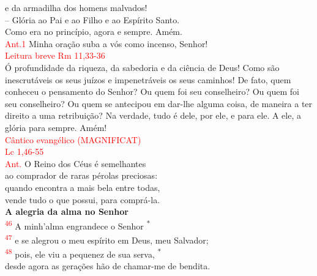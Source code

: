\documentclass{book}
\begin{document}
\begin{center}
    e da armadilha dos homens malvados!
    \vspace{.2cm} \\
    -- Glória ao Pai e ao Filho e ao Espírito Santo. \\
    Como era no princípio, agora e sempre. Amém.
    \vspace{.2cm} \\
    \textcolor{red}{Ant.1} Minha oração suba a vós como incenso, Senhor!
    \vspace{.2cm} \\
    \textcolor{red}{Leitura breve Rm 11,33-36}
    \vspace{.2cm} \\
    Ó profundidade da riqueza, da sabedoria e da ciência de Deus! Como são inescrutáveis os seus juízos e impenetráveis os seus caminhos! De fato, quem conheceu o pensamento do Senhor? Ou quem foi seu conselheiro? Ou quem foi seu conselheiro? Ou quem se antecipou em dar-lhe alguma coisa, de maneira a ter direito a uma retribuição? Na verdade, tudo é dele, por ele, e para ele. A ele, a glória para sempre. Amém!
    \vspace{.2cm} \\
    \textcolor{red}{Cântico evangélico (MAGNIFICAT) \\ Lc 1,46-55}
    \vspace{.2cm} \\
    \textcolor{red}{Ant.} O Reino dos Céus é semelhantes \\
    ao comprador de raras pérolas preciosas: \\
    quando encontra a mais bela entre todas, \\
    vende tudo o que possui, para comprá-la.
    \vspace{.2cm} \\
    \textbf{A alegria da alma no Senhor}
    \vspace{.2cm} \\
    \textsuperscript{\underline{\hspace{.07in}}\textcolor{red}{46}} A minh'alma engrandece o Senhor \textsuperscript{*} \\
    \textsuperscript{\textcolor{red}{47}} e se alegrou o meu espírito em Deus, meu Salvador; \\
    \textsuperscript{\underline{\hspace{.07in}}\textcolor{red}{48}} pois, ele viu a pequenez de sua serva, \textsuperscript{*}\\
    desde agora as gerações hão de chamar-me de bendita.

\end{center}
\end{document}

